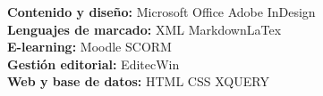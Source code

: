

\begin{cvparagraph}

\textbf{Contenido y diseño:} \hspace{0.3cm} {Microsoft Office{\quad\textbar\quad} Adobe InDesign} \\
\textbf{Lenguajes de marcado:}\hspace{0.3cm} {XML}{\quad\textbar\quad} {Markdown}{\quad\textbar\quad}{LaTex} \\
\textbf{E-learning:}\hspace{0.3cm} {Moodle}{\quad\textbar\quad} {SCORM} \\
\textbf{Gestión editorial:} \hspace{0.3cm} {EditecWin} \\
\textbf{Web y base de datos:} \hspace{0.3cm} {HTML}{\quad\textbar\quad} {CSS}{\quad\textbar\quad} {XQUERY}

\end{cvparagraph}
